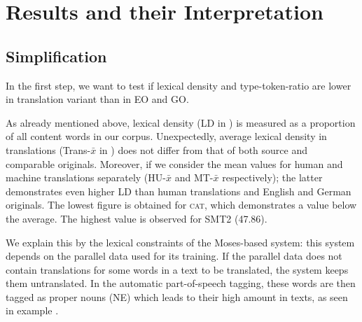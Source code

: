 \documentclass[output=paper]{LSP/langsci}
\begin{document}
\section{Results and their Interpretation} 
\subsection{Simplification}
In the first step, we want to test if lexical density and type-token-ratio are lower in translation variant than in EO and GO.


     \begin{table}
     \centering
 \caption{STTR and LD in VARTRA-SMALL}
     \label{tab:4.2}
\end{table}


As already mentioned above, lexical density (LD in ) is measured as a proportion of all content words in our corpus. Unexpectedly, average lexical density in translations (Trans-$\bar{x}$ in ) does not differ from that of both source and comparable originals. Moreover, if we consider the mean values for human and machine translations separately (HU-$\bar{x}$ and MT-$\bar{x}$ respectively); the latter demonstrates even higher LD than human translations and English and German originals. The lowest figure is obtained for \textsc{cat}, which demonstrates a value below the average. The highest value is observed for SMT2 (47.86).

We explain this by the lexical constraints of the Moses-based system: this system depends on the parallel data used for its training.  If the parallel data does not contain translations for some words in a text to be translated, the system keeps them untranslated. In the automatic part-of-speech tagging, these words are then tagged as proper nouns (NE) which leads to their high amount in texts, as seen in example .
\end{document}

